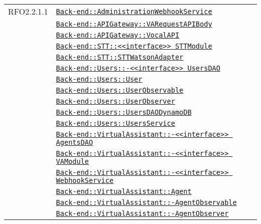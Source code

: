 \begin{longtable}{|>{\centering}m{3cm}|m{10cm}<{\centering}|}
RFO2.2.1.1 & \hyperref[Back-end::AdministrationWebhookService]{\texttt{Back-end::AdministrationWebhookService}}\\
& \hyperref[Back-end::APIGateway::VARequestAPIBody]{\texttt{Back-end::APIGateway::VARequestAPIBody}}\\
& \hyperref[Back-end::APIGateway::VocalAPI]{\texttt{Back-end::APIGateway::VocalAPI}}\\
& \hyperref[Back-end::STT::<<interface>> STTModule]{\texttt{Back-end::STT::<<interface>> STTModule}}\\
& \hyperref[Back-end::STT::STTWatsonAdapter]{\texttt{Back-end::STT::STTWatsonAdapter}}\\
& \hyperref[Back-end::Users::<<interface>> UsersDAO]{\texttt{Back-end::Users::-\linebreak <<interface>> UsersDAO}}\\
& \hyperref[Back-end::Users::User]{\texttt{Back-end::Users::User}}\\
& \hyperref[Back-end::Users::UserObservable]{\texttt{Back-end::Users::UserObservable}}\\
& \hyperref[Back-end::Users::UserObserver]{\texttt{Back-end::Users::UserObserver}}\\
& \hyperref[Back-end::Users::UsersDAODynamoDB]{\texttt{Back-end::Users::UsersDAODynamoDB}}\\
& \hyperref[Back-end::Users::UsersService]{\texttt{Back-end::Users::UsersService}}\\
& \hyperref[Back-end::VirtualAssistant::<<interface>> AgentsDAO]{\texttt{Back-end::VirtualAssistant::-\linebreak <<interface>> AgentsDAO}}\\
& \hyperref[Back-end::VirtualAssistant::<<interface>> VAModule]{\texttt{Back-end::VirtualAssistant::-\linebreak <<interface>> VAModule}}\\
& \hyperref[Back-end::VirtualAssistant::<<interface>> WebhookService]{\texttt{Back-end::VirtualAssistant::-\linebreak <<interface>> WebhookService}}\\
& \hyperref[Back-end::VirtualAssistant::Agent]{\texttt{Back-end::VirtualAssistant::Agent}}\\
& \hyperref[Back-end::VirtualAssistant::AgentObservable]{\texttt{Back-end::VirtualAssistant::-\linebreak AgentObservable}}\\
& \hyperref[Back-end::VirtualAssistant::AgentObserver]{\texttt{Back-end::VirtualAssistant::-\linebreak AgentObserver}}\\

\end{longtable}
